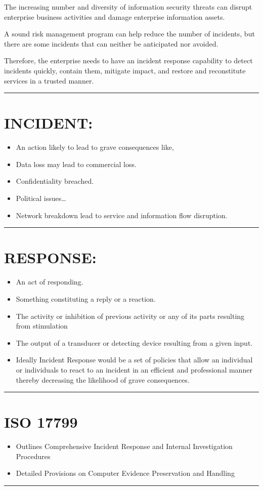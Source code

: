 \documentclass[10pt,british,english]{article}
\begin{document}
The increasing number and diversity of information security threats
can disrupt enterprise business activities and damage enterprise information
assets. 

A sound risk management program can help reduce the number of incidents,
but there are some incidents that can neither be anticipated nor avoided. 

Therefore, the enterprise needs to have an incident response capability
to detect incidents quickly, contain them, mitigate impact, and restore
and reconstitute services in a trusted manner.

\rule[0.5ex]{1\columnwidth}{1pt}

\section{INCIDENT: }
\begin{itemize}
\item An action likely to lead to grave consequences like,
\item Data loss may lead to commercial loss.
\item Confidentiality breached.
\item Political issues\dots{}
\item Network breakdown lead to service and information flow disruption.
\end{itemize}
\rule[0.5ex]{1\columnwidth}{1pt}

\section{RESPONSE: }
\begin{itemize}
\item An act of responding.
\item Something constituting a reply or a reaction.
\item The activity or inhibition of previous activity or any of its parts
resulting from stimulation
\item The output of a transducer or detecting device resulting from a given
input.
\item Ideally Incident Response would be a set of policies that allow an
individual or individuals to react to an incident in an efficient
and professional manner thereby decreasing the likelihood of grave
consequences.
\end{itemize}
\rule[0.5ex]{1\columnwidth}{1pt}

\section{ISO 17799 }
\begin{itemize}
\item Outlines Comprehensive Incident Response and Internal Investigation
Procedures
\item Detailed Provisions on Computer Evidence Preservation and Handling 
\end{itemize}
\rule[0.5ex]{1\columnwidth}{1pt}
\end{document}
